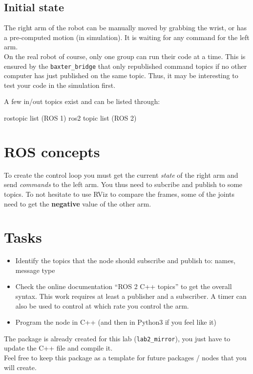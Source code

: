 \documentclass{ecnreport}
\begin{document}
\subsection{Initial state}

The right arm of the robot can be manually moved by grabbing the wrist, or has a pre-computed motion (in simulation). 
It is waiting for any command for the left arm.\\

On the real robot of course, only one group can run their code at a time. This is ensured by the \texttt{baxter\_bridge} that only republished command topics if no other computer has just published on the same topic. Thus, it may be interesting to test your code in the simulation first.

A few in/out topics exist and can be listed through:
\begin{bashcodelarge}
rostopic list (ROS 1)
ros2 topic list (ROS 2)
\end{bashcodelarge}

\section{ROS concepts}

To create the control loop you must get the current \emph{state} of the right arm and send \emph{commands} to 
the left arm. You thus need to subcribe and publish to some topics. To not hesitate to use RViz to compare the frames, some of the joints need to get the \textbf{negative}
value of the other arm.

\section{Tasks}

\begin{itemize}
\item Identify the topics that the node should subscribe and publish to: names, message type
\item Check the online documentation ``ROS 2 C++ topics'' to get the overall syntax. This work requires at least a publisher and a subscriber. A timer can also be used to control at which rate you control the arm.
\item Program the node in C++ (and then in Python3 if you feel like it)
\end{itemize}

The package is already created for this lab (\texttt{lab2\_mirror}), you just have to update the C++ file and compile it.\\
Feel free to keep this package as a template for future packages / nodes that you will create.
\end{document}
